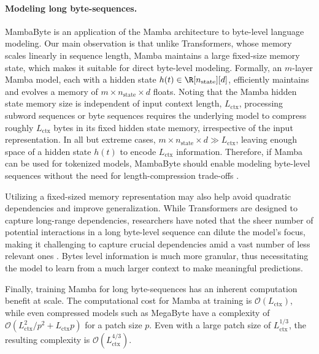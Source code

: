 \paragraph{Modeling long byte-sequences.} MambaByte is an application of the Mamba architecture to byte-level language modeling. Our main observation is that unlike Transformers, whose memory scales linearly in sequence length, Mamba maintains a large fixed-size memory state, which makes it suitable for direct byte-level modeling. Formally, an $m$-layer Mamba model, each with a hidden state $h(t) \in \R[n_\text{state}][d]$, efficiently maintains and evolves a memory of $m \times n_\text{state} \times d$ floats. Noting that the Mamba hidden state memory size is independent of input context length, $L_\text{ctx}$, processing subword sequences or byte sequences requires the underlying model to compress roughly $L_\text{ctx}$ bytes in its fixed hidden state memory, irrespective of the input representation. In all but extreme cases, $m \times n_\text{state} \times d \gg L_\text{ctx}$, leaving enough space of a hidden state $h(t)$ to encode $L_\text{ctx}$ information. Therefore, if Mamba can be used for tokenized models, MambaByte should enable modeling byte-level sequences without the need for length-compression trade-offs \citep{dai2020funnel,nawrot2022hierarchical,yu2023megabyte}.

Utilizing a fixed-sized memory representation may also help avoid quadratic dependencies and improve generalization. While Transformers are designed to capture long-range dependencies, researchers have noted that the sheer number of potential interactions in a long byte-level sequence can dilute the model's focus, making it challenging to capture crucial dependencies amid a vast number of less relevant ones \citep{tworkowski2024focused}. Bytes level information is much more granular, thus necessitating the model to learn from a much larger context to make meaningful predictions.

Finally, training Mamba for long byte-sequences has an inherent computation benefit at scale. The computational cost for Mamba at training is $\mathcal{O}(L_\text{ctx})$, while even compressed models such as MegaByte \citep{yu2023megabyte} have a complexity of $\mathcal{O}(L_\text{ctx}^2/p^2 + L_\text{ctx}p)$ for a patch size $p$. Even with a large patch size of $L_\text{ctx}^{1/3}$, the resulting complexity is $\mathcal{O}(L_\text{ctx}^{4/3})$.

